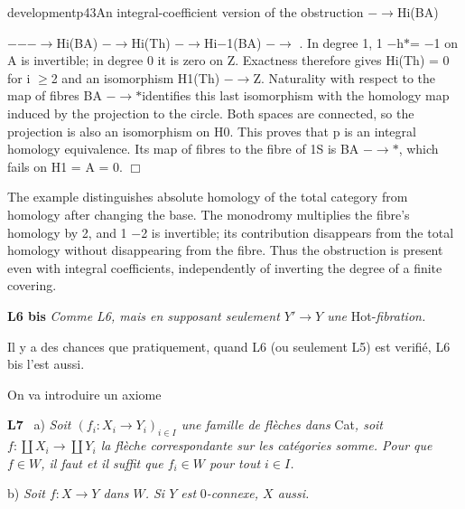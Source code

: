 \begin{dcomment}{development}{p43}{An integral-coefficient version of the obstruction}
\textperiodcentered{} \textperiodcentered{} \textperiodcentered{} \ensuremath{-}\ensuremath{\to}Hi(BA)

\ensuremath{-}\ensuremath{-}\ensuremath{-}\ensuremath{\to}Hi(BA) \ensuremath{-}\ensuremath{\to}Hi(Th) \ensuremath{-}\ensuremath{\to}Hi\ensuremath{-}1(BA) \ensuremath{-}\ensuremath{\to}\textperiodcentered{} \textperiodcentered{} \textperiodcentered{} . In degree 1, 1 \ensuremath{-}h\ensuremath{*}= \ensuremath{-}1 on A is invertible; in degree 0 it is zero on Z. Exactness therefore gives Hi(Th) = 0 for i \ensuremath{\geq}2 and an isomorphism H1(Th) \ensuremath{-}\ensuremath{\to}Z. Naturality with respect to the map of fibres BA \ensuremath{-}\ensuremath{\to}\ensuremath{*}identifies this last isomorphism with the homology map induced by the projection to the circle. Both spaces are connected, so the projection is also an isomorphism on H0. This proves that p is an integral homology equivalence. Its map of fibres to the fibre of 1S is BA \ensuremath{-}\ensuremath{\to}\ensuremath{*}, which fails on H1 = A = 0. \ensuremath{\Box}

The example distinguishes absolute homology of the total category from homology after changing the base. The monodromy multiplies the fibre’s homology by 2, and 1 \ensuremath{-}2 is invertible; its contribution disappears from the total homology without disappearing from the fibre. Thus the obstruction is present even with integral coefficients, independently of inverting the degree of a finite covering.

\end{dcomment}


\textbf{L6 bis} \textit{Comme L6, mais en supposant seulement $Y' \longrightarrow Y$ une} Hot-\textit{fibration.}


Il y a des chances que pratiquement, quand L6 (ou seulement L5) est verifié, L6 bis l'est aussi. %

On va introduire un axiome

\textbf{L7} \ a) \textit{Soit $(f_i : X_i \longrightarrow Y_i)_{i \in I}$ une famille de flèches dans} Cat\textit{, soit $f : \coprod X_i \longrightarrow \coprod Y_i$ la flèche correspondante sur les catégories somme. Pour que $f \in W$, il faut et il suffit que $f_i \in W$ pour tout $i \in I$.}

\hspace*{2em}b) \textit{Soit $f : X \longrightarrow Y$ dans $W$. Si $Y$ est} $0$\textit{-connexe, $X$ aussi.}

